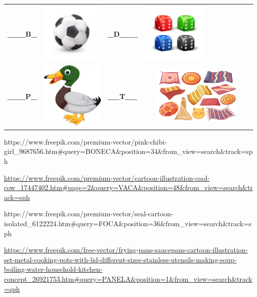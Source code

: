 {\begin{longtable}[]{@{}llll@{}}
\textbf{\_\_\_B\_} &
\includegraphics[width=1.13542in,height=1.13542in]{media/image22.jpeg} &
\textbf{\_D\_\_\_} &
\includegraphics[width=1.23958in,height=1.15833in]{media/image23.jpeg}\tabularnewline
\textbf{\_\_\_P\_} &
\includegraphics[width=1.19722in,height=1.27083in]{media/image24.jpeg} &
\textbf{\_\_T\_\_} &
\includegraphics[width=2.21875in,height=1.11458in]{media/image25.jpeg}\tabularnewline
\bottomrule
\end{longtable}

https://www.freepik.com/premium-vector/pink-chibi-girl\_9687656.htm\#query=BONECA\&position=34\&from\_view=search\&track=sph

\url{https://www.freepik.com/premium-vector/cartoon-illustration-cool-cow_17447402.htm\#page=2\&query=VACA\&position=48\&from_view=search\&track=sph}

https://www.freepik.com/premium-vector/seal-cartoon-isolated\_6122224.htm\#query=FOCA\&position=36\&from\_view=search\&track=sph

\url{https://www.freepik.com/free-vector/frying-pans-saucepans-cartoon-illustration-set-metal-cooking-pots-with-lid-different-sizes-stainless-utensils-making-soup-boiling-water-household-kitchen-concept_26921753.htm\#query=PANELA\&position=1\&from_view=search\&track=sph}

}
